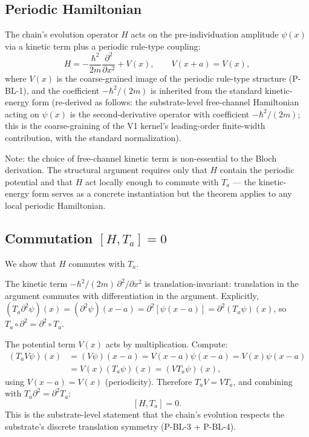 \documentclass[11pt,a4paper]{article}
\begin{document}
\subsection{Periodic Hamiltonian}

The chain's evolution operator $H$ acts on the pre-individuation amplitude $\psi(x)$ via a kinetic term plus a periodic rule-type coupling:
\[
H = -\frac{\hbar^{2}}{2m} \frac{\partial^{2}}{\partial x^{2}} + V(x), \qquad V(x + a) = V(x),
\]
where $V(x)$ is the coarse-grained image of the periodic rule-type structure (P-BL-1), and the coefficient $-\hbar^2/(2m)$ is inherited from the standard kinetic-energy form (re-derived as follows: the substrate-level free-channel Hamiltonian acting on $\psi(x)$ is the second-derivative operator with coefficient $-\hbar^2/(2m)$; this is the coarse-graining of the V1 kernel's leading-order finite-width contribution, with the standard normalization).

Note: the choice of free-channel kinetic term is non-essential to the Bloch derivation. The structural argument requires only that $H$ contain the periodic potential and that $H$ act locally enough to commute with $T_a$ --- the kinetic-energy form serves as a concrete instantiation but the theorem applies to any local periodic Hamiltonian.

\subsection{Commutation $[H, T_a] = 0$}

We show that $H$ commutes with $T_a$.

The kinetic term $-\hbar^2/(2m)\,\partial^2/\partial x^2$ is translation-invariant: translation in the argument commutes with differentiation in the argument. Explicitly, $(T_a\partial^2\psi)(x) = (\partial^2\psi)(x-a) = \partial^2[\psi(x-a)] = \partial^2(T_a\psi)(x)$, so $T_a \circ \partial^2 = \partial^2 \circ T_a$.

The potential term $V(x)$ acts by multiplication. Compute:
\begin{align*}
(T_a V \psi)(x) &= (V\psi)(x - a) = V(x - a) \psi(x - a) = V(x) \psi(x - a) \\
&= V(x) (T_a \psi)(x) = (V T_a \psi)(x),
\end{align*}
using $V(x-a) = V(x)$ (periodicity). Therefore $T_a V = V T_a$, and combining with $T_a \partial^2 = \partial^2 T_a$:
\[
[H, T_a] = 0.
\]
This is the substrate-level statement that the chain's evolution respects the substrate's discrete translation symmetry (P-BL-3 + P-BL-4).
\end{document}
